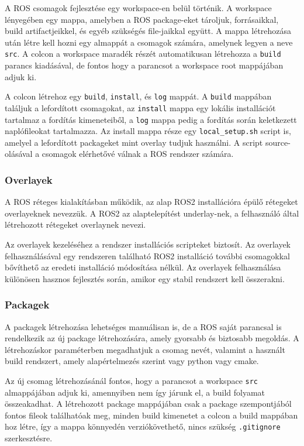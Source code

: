 A ROS csomagok fejlesztése egy workspace-en belül történik. A workspace
lényegében egy mappa, amelyben a ROS package-eket tároljuk, forrásaikkal, build
artifactjeikkel, és egyéb szükségés file-jaikkal együtt.  A mappa létrehozása
után létre kell hozni egy almappát a csomagok számára, amelynek legyen a neve
\verb|src|.  A colcon a workspace maradék részét automatikusan létrehozza a
\verb|build| parancs kiadásával, de fontos hogy a parancsot a workspace root
mappájában adjuk ki.

A colcon létrehoz egy \verb|build|, \verb|install|, és \verb|log| mappát. A
\verb|build| mappában találjuk a lefordított csomagokat, az \verb|install| mappa
egy lokális installációt tartalmaz a fordítás kimeneteiből, a \verb|log| mappa
pedig a fordítás során keletkezett naplófileokat tartalmazza. Az install mappa
része egy \verb|local_setup.sh| script is, amelyel a lefordított packageket mint
overlay tudjuk használni. A script source-olásával a csomagok elérhetővé válnak a
ROS rendszer számára.

\subsubsection{Overlayek}

A ROS réteges kialakításban működik, az alap ROS2 installációra épülő rétegeket
overlayeknek nevezzük. A ROS2 az alaptelepítést underlay-nek, a felhasználó által
létrehozott rétegeket overlaynek nevezi.

Az overlayek kezeléséhez a rendszer installációs scripteket biztosít. Az
overlayek felhasználásával egy rendszeren található ROS2 installáció további
csomagokkal bővíthető az eredeti installáció módosítása nélkül. Az overlayek
felhasználása különösen hasznos fejlesztés során, amikor egy stabil rendszert
kell összerakni.

\subsubsection{Packagek}

A packagek létrehozása lehetséges manuálisan is, de a ROS saját parancsal is
rendelkezik az új package létrehozására, amely gyorsabb és biztosabb megoldás. A
létrehozáskor paraméterben megadhatjuk a csomag nevét, valamint a használt build
rendszert, amely alapértelmezés szerint vagy python vagy cmake.

Az új csomag létrehozásánál fontos, hogy a parancsot a workspace \verb|src|
almappájában adjuk ki, amennyiben nem így járunk el, a build folyamat
összeakadhat. A létrehozott package mappájában csak a package szempontjából
fontos fileok találhatóak meg, minden build kimenetet a colcon a build mappában
hoz létre, így a mappa könnyedén verziókövethető, nincs szükség \verb|.gitignore|
szerkesztésre.

